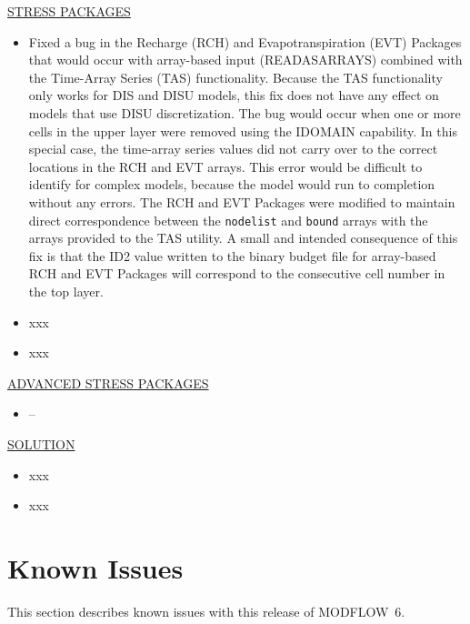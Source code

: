 \documentclass[11pt,twoside,twocolumn]{usgsreport}
\begin{document}
\begin{itemize}
	\underline{STRESS PACKAGES}
	\begin{itemize}
	        \item Fixed a bug in the Recharge (RCH) and Evapotranspiration (EVT) Packages that would occur with array-based input (READASARRAYS) combined with the Time-Array Series (TAS) functionality.  Because the TAS functionality only works for DIS and DISU models, this fix does not have any effect on models that use DISU discretization.  The bug would occur when one or more cells in the upper layer were removed using the IDOMAIN capability.  In this special case, the time-array series values did not carry over to the correct locations in the RCH and EVT arrays.  This error would be difficult to identify for complex models, because the model would run to completion without any errors.  The RCH and EVT Packages were modified to maintain direct correspondence between the \texttt{nodelist} and \texttt{bound} arrays with the arrays provided to the TAS utility.  A small and intended consequence of this fix is that the ID2 value written to the binary budget file for array-based RCH and EVT Packages will correspond to the consecutive cell number in the top layer.  
	        \item xxx  
	        \item xxx  
	\end{itemize}

	\underline{ADVANCED STRESS PACKAGES}
	\begin{itemize}
	        \item--
	\end{itemize}

	\underline{SOLUTION}
	\begin{itemize}
	        \item xxx  
	        \item xxx  
	\end{itemize}

\end{itemize}


\section{Known Issues}
This section describes known issues with this release of MODFLOW~6.  
\end{document}
